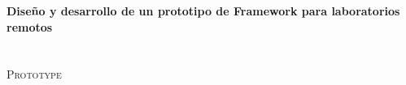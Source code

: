 \thispagestyle{empty}

\begin{center}
		\vspace*{6cm} 
		{\huge \textbf{Diseño y desarrollo de un prototipo de 
		Framework para laboratorios remotos}}\\
		\\
		\vspace{2cm}
		{\huge \textsc{\RLFnormal}}\\
		\vspace{0.5cm}
		{\large \textsc{Prototype}}\\
		\vspace{4cm}
		{\large \Carlos}
		\vfill
		\Copyright{}
\end{center}


